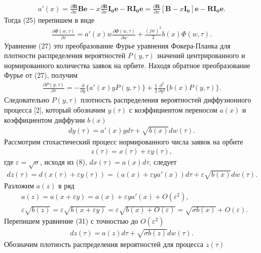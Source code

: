 \begin{align*}
	a'(x)=\frac{\partial \boldsymbol{R}}{\partial x}\boldsymbol{Be}-x\frac{\partial \boldsymbol{R}}{\partial x}\boldsymbol{I_{0}} \boldsymbol{e}-\boldsymbol{RI_{0}e}=\frac{\partial \boldsymbol{R}}{\partial x}[\boldsymbol{B}-x\boldsymbol{I_{0}}] \boldsymbol{e}-\boldsymbol{RI_{0}e}.
\end{align*}
Тогда (25) перепишем в виде
\begin{align}
	\frac{\partial \Phi (w,\tau)}{\partial \tau}=a'(x) w\frac{\partial \Phi (w,\tau)}{\partial w}+\frac{(jw)^2}{2}b(x)\Phi(w,\tau).
\end{align}
Уравнение (27) это преобразование Фурье уравнения Фокера-Планка для плотности распределения вероятностей $P(y, \tau )$ значений центрированного и нормированного количества заявок на орбите. Находя обратное преобразование Фурье от (27), получим
\begin{align}
	\frac{\partial P (y,\tau)}{\partial \tau}=-\frac{\partial}{\partial y}\{a'(x)yP(y,\tau)\} 
	+\frac{1}{2}\frac{\partial^2}{\partial y^2}\{b(x)P(y,\tau)\}.
\end{align}
Следовательно $P (y,\tau)$ плотность распределения вероятностей диффузионного процесса [2], который обозначим $y(\tau)$ с коэффициентом переносом $a(x)$ и коэффициентом диффузии $b(x)$
\begin{align}
	dy(\tau)=a'(x)yd\tau+\sqrt{b(x)}dw(\tau).
\end{align}
Рассмотрим стохастический процесс нормированного числа заявок на орбите
\begin{align}
	z(\tau)=x(\tau)+\varepsilon y(\tau),
\end{align}
где $\varepsilon=\sqrt{\sigma}$, исходя из (8), $dx(\tau)=a(x)d\tau$, следует
\begin{align}
	dz(\tau)=d(x(\tau)+\varepsilon y(\tau))=(a(x)+\varepsilon ya'(x))d\tau+\varepsilon \sqrt{b(x)}dw(\tau).
\end{align}
Разложим $a(z)$ в ряд 
\begin{align*}
	&a(z)=a(x+\varepsilon y)=a(x)+\varepsilon y a'(x)+O(\varepsilon^2),\\
	&\varepsilon\sqrt{b(z)}=\varepsilon\sqrt{b(x+\varepsilon y)}=\varepsilon\sqrt{b(x)+O(\varepsilon)}=\sqrt{\sigma b(x)}+O(\varepsilon).
\end{align*}
Перепишем уравнение (31) с точностью до $O(\varepsilon^2)$
\begin{align}
	dz(\tau)=a(z)d\tau+\sqrt{\sigma b(z)}dw(\tau).
\end{align}
Обозначим плотность распределения вероятностей для процесса $z(\tau)$
